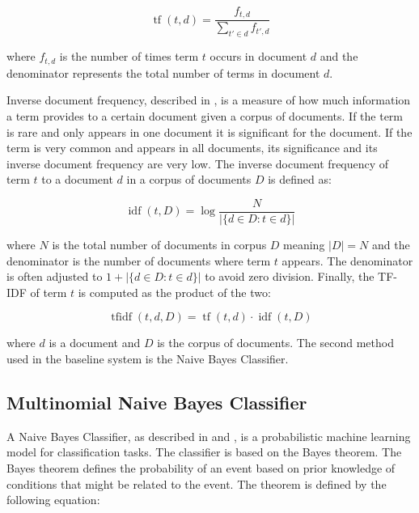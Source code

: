 \begin{equation}    
     \operatorname{tf}(t, d) = \displaystyle{\frac{f_{t,d}}{\sum_{t' \in d} f_{t', d}}}
\end{equation}

where $f_{t,d}$ is the number of times term $t$ occurs in document $d$ and the denominator represents the total number of terms in document $d$.

Inverse document frequency, described in \cite{idf}, is a measure of how much information a term provides to a certain document given a corpus of documents. If the term is rare and only appears in one document it is significant for the document. If the term is very common and appears in all documents, its significance and its inverse document frequency are very low. The inverse document frequency of term $t$ to a document $d$ in a corpus of documents $D$ is defined as:

\begin{equation}
     \operatorname{idf}(t, D) =  \operatorname{log} \displaystyle{\frac{N}{|\{d \in D : t \in d\}|}}
\end{equation}

where $N$ is the total number of documents in corpus $D$ meaning $|D| = N$ and the denominator is the number of documents where term $t$ appears. The denominator is often adjusted to $1 + |\{d \in D : t \in d\}|$ to avoid zero division. Finally, the TF-IDF of term $t$ is computed as the product of the two:

\begin{equation}    
     \operatorname{tfidf}(t, d, D) =  \operatorname{tf}(t,d) \cdot  \operatorname{idf}(t, D)
\end{equation}

where $d$ is a document and $D$ is the corpus of documents. The second method used in the baseline system is the Naive Bayes Classifier.

\subsection*{Multinomial Naive Bayes Classifier}
A Naive Bayes Classifier, as described in \cite{bayes} and \cite{bayes-theorem}, is a probabilistic machine learning model for classification tasks. The classifier is based on the Bayes theorem. The Bayes theorem defines the probability of an event based on prior knowledge of conditions that might be related to the event. The theorem is defined by the following equation:

